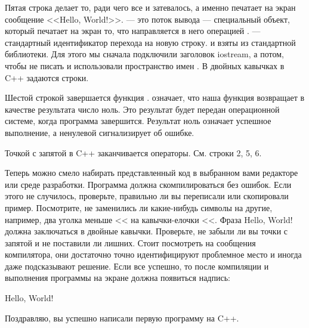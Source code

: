 \documentclass{article}
\begin{document}
Пятая строка делает то, ради чего все и затевалось, а именно печатает на экран сообщение <<Hello, World!>>.  --- это поток вывода --- специальный объект, который печатает на экран то, что направляется в него операцией \cppword{<{}<}.  --- стандартный идентификатор перехода на новую строку.  и  взяты из стандартной библиотеки. Для этого мы сначала подключили заголовок iostream, а потом, чтобы не писать  и  использовали пространство имен . В двойных кавычках в C++ задаются строки.

Шестой строкой завершается функция .  означает, что наша функция возвращает в качестве результата число ноль. Это результат будет передан операционной системе, когда программа завершится. Результат ноль означает успешное выполнение, а ненулевой сигнализирует об ошибке.

Точкой с запятой в C++ заканчивается операторы. См. строки 2, 5, 6.

Теперь можно смело набирать представленный код в выбранном вами редакторе или среде разработки. Программа должна скомпилироваться без ошибок. Если этого не случилось, проверьте, правильно ли вы переписали или скопировали пример. Посмотрите, не заменились ли какие-нибудь символы на другие, например, два уголка меньше <{}< на кавычки-елочки <<. Фраза Hello, World! должна заключаться в двойные кавычки. Проверьте, не забыли ли вы точки с запятой и не поставили ли лишних. Стоит посмотреть на сообщения компилятора, они достаточно точно идентифицируют проблемное место и иногда даже подсказывают решение. Если все успешно, то после компиляции и выполнения программы на экране должна появиться надпись:

Hello, World!

Поздравляю, вы успешно написали первую программу на C++.
\end{document}
